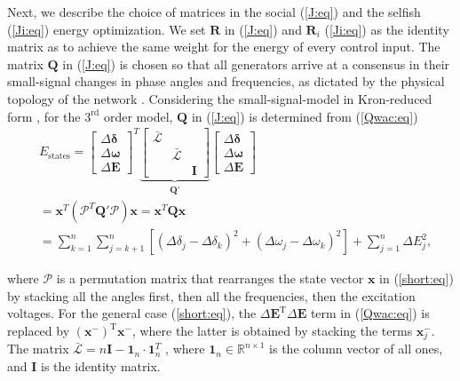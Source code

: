 \documentclass[12pt, draftclsnofoot,onecolumn]{IEEEtran}
\begin{document}
Next, we describe the choice of matrices in the social (\ref{J:eq}) and the selfish (\ref{Ji:eq}) energy optimization. We set $\boldsymbol{R}$ in (\ref{J:eq}) and ${\boldsymbol R}_i$ (\ref{Ji:eq}) as the identity matrix as to achieve the same weight for the energy of every control input. The matrix ${\boldsymbol Q}$ in (\ref{J:eq}) is chosen so that all generators arrive at a consensus in their small-signal changes in phase angles and frequencies, as dictated by the physical topology of the network \cite{lianensuring,dorjovchebulTPS14}. Considering the small-signal-model in Kron-reduced form \cite{pramod}, for the $3^{\mathrm{rd}}$ order model, $\boldsymbol{Q}$ in (\ref{J:eq}) is determined from (\ref{Qwac:eq})
\begin{align}
&E_{\mathrm{states}} =  \begin{bmatrix}\Delta {\boldsymbol \delta}\\ \Delta {\boldsymbol \omega} \\ \Delta {\boldsymbol E}\end{bmatrix}^T
\underbrace{\begin{bmatrix}\bar {\mathcal L} & ~ &~\\
~& \bar {\mathcal L} & ~\\
~&~& {\boldsymbol I}\end{bmatrix} }_{{\boldsymbol Q}'}
\begin{bmatrix}\Delta {\boldsymbol \delta}\\ \Delta {\boldsymbol \omega} \\ \Delta {\boldsymbol E}\end{bmatrix} \nonumber\\ 
&= {\boldsymbol x}^T({\mathcal P}^T{\boldsymbol Q'}{\mathcal P}){\boldsymbol x} = {\boldsymbol x}^T{\boldsymbol Q}{\boldsymbol x}\nonumber \\
&=\sum_{k=1}^{n}{\sum_{j=k+1}^{n}{[(\Delta \delta_j - \Delta \delta_k)^2 + (\Delta \omega_j -\Delta \omega_k)^2]}} + \sum_{j=1}^{n}{\Delta E_j^2}, 
\label{Qwac:eq}
\end{align}

\noindent where $\mathcal P$ is a permutation matrix that rearranges the state vector $\boldsymbol x$ in (\ref{short:eq}) by stacking all the angles first, then all the frequencies, then the excitation voltages. For the general case (\ref{short:eq}), the $\Delta {\boldsymbol E}^{\mathrm{T}}\Delta {\boldsymbol E}$ term in (\ref{Qwac:eq}) is replaced by $({\boldsymbol x}^-)^{\mathrm{T}}{\boldsymbol x}^-$, where the latter is obtained by stacking the terms $\boldsymbol{x}_j^{-}$. The matrix $\bar {\mathcal L} = n{\boldsymbol I}-{\boldsymbol 1}_n \cdot{\boldsymbol 1}_n^T$ \cite{Lian:aa}, where $\boldsymbol{1}_n\in \mathbb{R}^{n \times 1}$ is the column vector of all ones, and $\boldsymbol{I}$ is the identity matrix.
\end{document}
